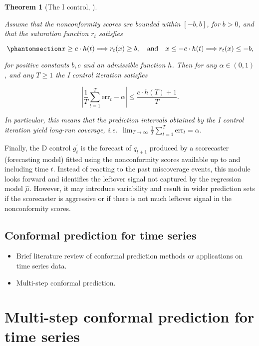 \documentclass[
  11pt,
  a4paper,
]{article}
\theoremstyle{plain}
\theoremstyle{plain}
\newtheorem{theorem}{Theorem}[section]
\theoremstyle{remark}
\begin{document}
\begin{theorem}[The I control,
\textcite{angelopoulos2024}]\protect\hypertarget{thm-pid_i}{}\label{thm-pid_i}

Assume that the nonconformity scores are bounded within \([-b, b]\), for
\(b>0\), and that the saturation function \(r_t\) satisfies

\begin{equation}\phantomsection\label{eq-saturation}{
x \geq c \cdot h(t) \Longrightarrow r_t(x) \geq b, \quad \text {and} \quad x \leq-c \cdot h(t) \Longrightarrow r_t(x) \leq -b,
}\end{equation}

for positive constants \(b, c\) and an admissible function \(h\). Then
for any \(\alpha \in (0,1)\), and any \(T \geq 1\) the I control
iteration satisfies

\[
|\frac{1}{T}\sum_{t=1}^{T}\mathrm{err}_t - \alpha| \leq \frac{c \cdot h(T)+1}{T}.
\]

In particular, this means that the prediction intervals obtained by the
I control iteration yield long-run coverage,
i.e.~\(\lim _{T \rightarrow \infty} \frac{1}{T} \sum_{t=1}^T \mathrm{err}_t = \alpha\).

\end{theorem}

Finally, the D control \(g_t^{\prime}\) is the forecast of \(q_{t+1}\)
produced by a scorecaster (forecasting model) fitted using the
nonconformity scores available up to and including time \(t\). Instead
of reacting to the past miscoverage events, this module looks forward
and identifies the leftover signal not captured by the regression model
\(\hat{\mu}\). However, it may introduce variability and result in wider
prediction sets if the scorecaster is aggressive or if there is not much
leftover signal in the nonconformity scores.

\subsection{Conformal prediction for time series}\label{sec-review_ts}

\begin{itemize}
\item
  Brief literature review of conformal prediction methods or
  applications on time series data.
\item
  Multi-step conformal prediction.
\end{itemize}

\section{Multi-step conformal prediction for time
series}\label{sec-method}
\end{document}
